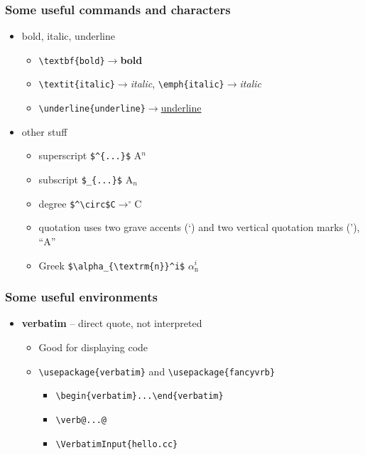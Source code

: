\documentclass[11pt]{beamer}
\begin{document}
%
%
\begin{frame}[fragile]\frametitle{Some useful commands and characters}
\begin{itemize}
	\item bold, italic, underline
	\begin{itemize}
		\item \verb+\textbf{bold}+$\rightarrow$\textbf{bold}
		\item \verb+\textit{italic}+$\rightarrow$\textit{italic}, \verb+\emph{italic}+$\rightarrow$\emph{italic}
		\item \verb+\underline{underline}+$\rightarrow$\underline{underline}
	\end{itemize}
	\item other stuff
	\begin{itemize}
		\item superscript \verb+$^{...}$+ A$^{n}$
		\item subscript \verb+$_{...}$+ A$_{n}$
		\item degree  \verb+$^\circ$C+$\rightarrow^\circ$C
		\item quotation uses two grave accents (`) and two vertical quotation marks ('), ``A''
		\item Greek \verb+$\alpha_{\textrm{n}}^i$+ $\alpha_{\textrm{n}}^i$
	\end{itemize}
\end{itemize}
\end{frame}

%
%
\begin{frame}[fragile]\frametitle{Some useful environments}
\begin{itemize}
	\item<1-> \textbf{verbatim} -- direct quote, not interpreted
		\begin{itemize}
			\item Good for displaying code
			\item \verb+\usepackage{verbatim}+ and \verb+\usepackage{fancyvrb}+
			\begin{itemize}
				\item \verb+\begin{verbatim}...\end{verbatim}+
				\item \verb+\verb@...@+
				\item \verb++ \\ \VerbatimInput{hello.cc}
			\end{itemize}
		\end{itemize}
\end{itemize}
\end{frame}
\end{document}
